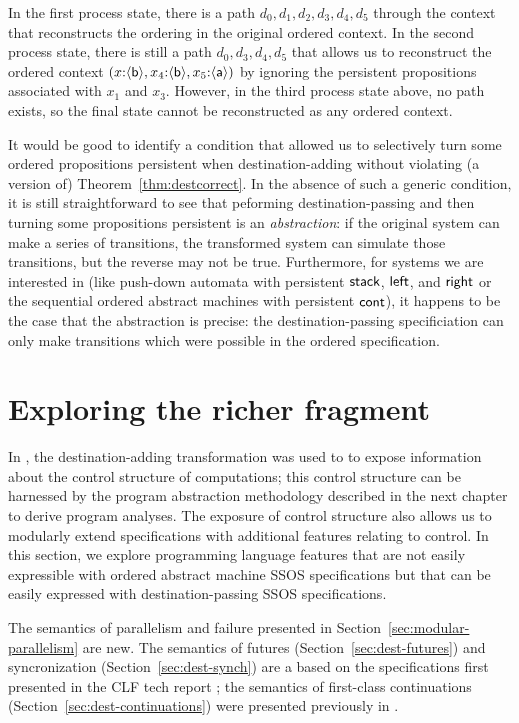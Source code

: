 In the
first process state, there is a path $d_0, d_1, d_2, d_3, d_4, d_5$ through
the context that reconstructs the ordering in the original ordered context.
In the second process state, there is still a path $d_0, d_3, d_4, d_5$ that
allows us to reconstruct the ordered context
$(x{:}\langle {\sf b} \rangle,
  x_4{:}\langle {\sf b} \rangle, x_5{:}\langle {\sf a} \rangle)$ by ignoring the persistent
propositions associated with $x_1$ and $x_3$. 
However, in the third process state above, no path exists, so the final
state cannot be reconstructed as any ordered context. 

It would be good to identify a condition that allowed us to
selectively turn some ordered propositions persistent when
destination-adding without violating (a version of)
Theorem~\ref{thm:destcorrect}. In the absence of such a generic
condition, it is still straightforward to see that peforming
destination-passing and then turning some propositions persistent is
an {\it abstraction}: if the original system can make a series of
transitions, the transformed system can simulate those transitions,
but the reverse may not be true. Furthermore, for systems we are
interested in (like push-down automata with persistent ${\sf stack}$,
${\sf left}$, and ${\sf right}$ or the sequential ordered abstract
machines with persistent ${\sf cont}$), it happens to be the case that
the abstraction is precise: the destination-passing specificiation can
only make transitions which were possible in the ordered
specification.

\section{Exploring the richer fragment}

In \cite{simmons11logical}, the destination-adding transformation was
used to to expose information about the control structure of
computations; this control structure can be harnessed by the program
abstraction methodology described in the next chapter to derive
program analyses. The exposure of control structure also allows us to
modularly extend specifications with additional features relating to
control. In this section, we explore programming language features
that are not easily expressible with ordered abstract machine SSOS
specifications but that can be easily expressed with
destination-passing SSOS specifications.

The semantics of parallelism and failure presented in
Section~\ref{sec:modular-parallelism} are new. The semantics of
futures (Section~\ref{sec:dest-futures}) and syncronization
(Section~\ref{sec:dest-synch}) are a based on the specifications first
presented in the CLF tech report \cite{cervesato02concurrent}; the
semantics of first-class continuations
(Section~\ref{sec:dest-continuations}) were presented previously in
\cite{pfenning04substructural,pfenning09substructural}.

